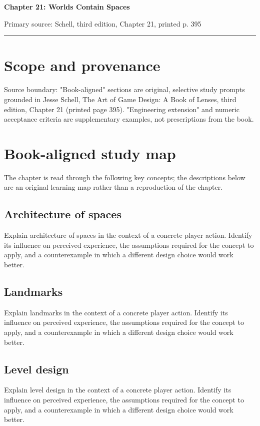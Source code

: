 \documentclass[11pt]{article}
\begin{document}
{\huge\bfseries\color{suiteblue} Chapter 21: Worlds Contain Spaces}\par
\vspace{0.15in}
{\normalsize\color{suitegray} Primary source: Schell, third edition, Chapter 21, printed p. 395}\par
\vspace{0.15in}\hrule\vspace{0.15in}

\section{Scope and provenance}
Source boundary: "Book-aligned" sections are original, selective study prompts grounded in Jesse Schell, The Art of Game Design: A Book of Lenses, third edition, Chapter 21 (printed page 395). "Engineering extension" and numeric acceptance criteria are supplementary examples, not prescriptions from the book.


\section{Book-aligned study map}
The chapter is read through the following key concepts; the descriptions below are an original learning map rather than a reproduction of the chapter.


\subsection{Architecture of spaces}
Explain architecture of spaces in the context of a concrete player action. Identify its influence on perceived experience, the assumptions required for the concept to apply, and a counterexample in which a different design choice would work better.


\subsection{Landmarks}
Explain landmarks in the context of a concrete player action. Identify its influence on perceived experience, the assumptions required for the concept to apply, and a counterexample in which a different design choice would work better.


\subsection{Level design}
Explain level design in the context of a concrete player action. Identify its influence on perceived experience, the assumptions required for the concept to apply, and a counterexample in which a different design choice would work better.
\end{document}
